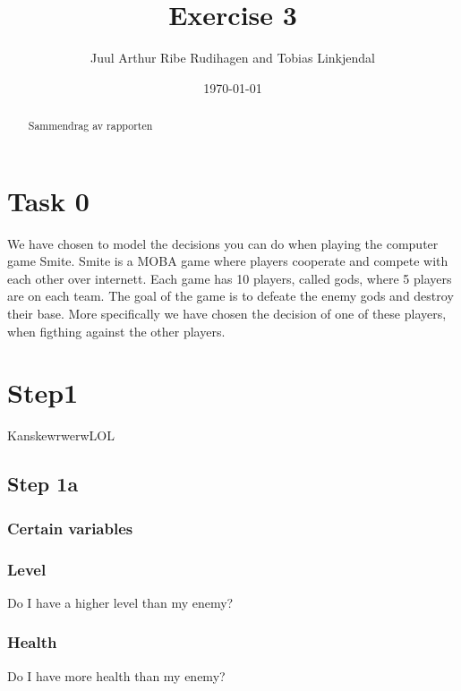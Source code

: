 \documentclass[titlepage]{article}
\author{Juul Arthur Ribe Rudihagen and Tobias Linkjendal}
\title{Exercise 3}
\date{\today}
\begin{document}
\maketitle

\renewcommand{\abstractname}{Summary}
\begin{abstract}
Sammendrag av rapporten
\end{abstract}

\tableofcontents

\newpage


\section{Task 0}
We have chosen to model the decisions you can do when playing the computer game Smite. Smite is a MOBA game where players cooperate and compete with each other over internett. Each game has 10 players, called gods, where 5 players are on each team. The goal of the game is to defeate the enemy gods and destroy their base. More specifically we have chosen the decision of one of these players, when figthing against the other players. 

\newpage


\section{Step1}
KanskewrwerwLOL

\subsection{Step 1a}
\subsubsection{Certain variables}
\subsubsection*{Level}
Do I have a higher level than my enemy?

\subsubsection*{Health}
Do I have more health than my enemy?
\end{document}
